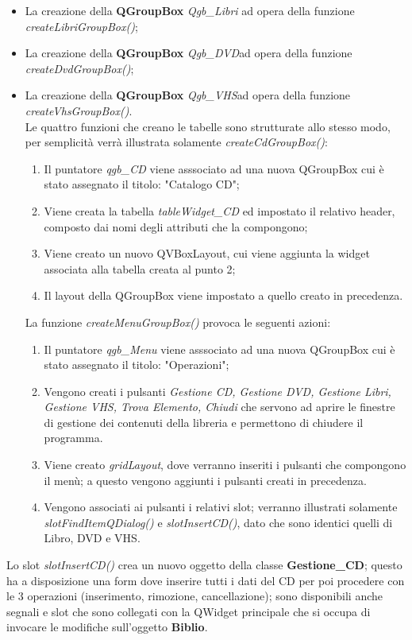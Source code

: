 {{\begin{itemize}
		\item La creazione della \textbf{QGroupBox} \textit{Qgb\_Libri} ad opera della funzione \textit{createLibriGroupBox()};
		\item La creazione della \textbf{QGroupBox} \textit{Qgb\_DVD}ad opera della funzione \textit{createDvdGroupBox()};
		\item La creazione della \textbf{QGroupBox} \textit{Qgb\_VHS}ad opera della funzione \textit{createVhsGroupBox()}.\\
		Le quattro funzioni che creano le tabelle sono strutturate allo stesso modo, per semplicità verrà illustrata solamente \textit{createCdGroupBox()}: 
		\begin{enumerate}
			\item Il puntatore \textit{qgb\_CD} viene asssociato ad una nuova QGroupBox cui è stato assegnato il titolo: "Catalogo CD";
			\item Viene creata la tabella \textit{tableWidget\_CD} ed impostato il relativo header, composto dai nomi degli attributi che la compongono;
			\item Viene creato un nuovo QVBoxLayout, cui viene aggiunta la widget associata alla tabella creata al punto 2;
			\item Il layout della QGroupBox viene impostato a quello creato in precedenza.
		\end{enumerate}
		La funzione \textit{createMenuGroupBox()} provoca le seguenti azioni:
		\begin{enumerate}
			\item Il puntatore \textit{qgb\_Menu} viene asssociato ad una nuova QGroupBox cui è stato assegnato il titolo: "Operazioni";
			\item Vengono creati i pulsanti \textit{Gestione CD, Gestione DVD, Gestione Libri, Gestione VHS, Trova Elemento, Chiudi} che servono ad aprire le finestre di gestione dei contenuti della libreria e permettono di chiudere il programma.
			\item Viene creato \textit{gridLayout}, dove verranno inseriti i pulsanti che compongono il menù; a questo vengono aggiunti i pulsanti creati in precedenza.
			\item Vengono associati ai pulsanti i relativi slot; verranno illustrati solamente \textit{slotFindItemQDialog()} e \textit{slotInsertCD()}, dato che sono identici quelli di Libro, DVD e VHS.
		\end{enumerate}
	\end{itemize}
	Lo slot \textit{slotInsertCD()} crea un nuovo oggetto della classe \textbf{Gestione\_CD}; questo ha a disposizione una form dove inserire tutti i dati del CD per poi procedere con le 3 operazioni (inserimento, rimozione, cancellazione); sono disponibili anche segnali e slot che sono collegati con la QWidget principale che si occupa di invocare le modifiche sull'oggetto \textbf{Biblio}. \\
}}
